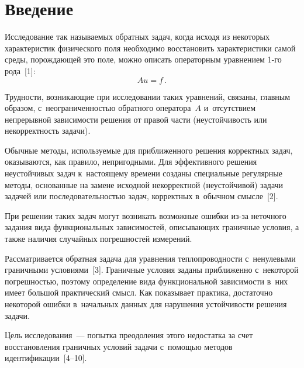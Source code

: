   
\vspace*{-3pt}



\thispagestyle{headings}

\begin{multicols}{2}

\label{st\stat}
  
\section{Введение}

  Исследование так называемых обратных задач, когда исходя из некоторых 
характеристик физического поля необходимо восстановить характеристики 
самой среды, порождающей это поле, можно описать операторным уравнением 
1-го рода~[1]:
  $$
  Au=f\,.
  $$
  
  Трудности, возникающие при исследовании \mbox{таких} уравнений, связаны, 
главным образом, с~неограниченностью обратного оператора~$A$ 
и~отсутствием непрерывной зависимости решения от \mbox{правой} части 
(неустойчивость или некорректность задачи). 
  
  Обычные методы, используемые для приближенного решения корректных 
задач, оказываются, как правило, непригодными. Для эффективного решения 
неустойчивых задач к~настоящему времени созданы специальные регулярные 
методы, основанные на замене исходной некорректной (неустойчивой) задачи 
задачей или последовательностью задач, корректных в~обычном смысле~[2].
  
  При решении таких задач могут возникать возможные ошибки из-за 
неточного задания вида функциональных зависимостей, описывающих 
граничные условия, а также наличия случайных погрешностей измерений.
  
  Рассматривается обратная задача для уравнения теплопроводности 
с~ненулевыми граничными условиями~[3]. Граничные условия заданы 
приближенно с~некоторой погрешностью, поэтому определение вида 
функциональной зависимости в~них имеет большой практический смысл. Как 
показывает практика, достаточно некоторой ошибки в~начальных данных для 
нарушения устойчивости решения задачи.
  
  Цель исследования~--- попытка преодоления этого недостатка за счет 
восстановления граничных условий задачи с~помощью методов 
идентификации~[4--10].

\vspace*{-6pt}



\end{multicols}
